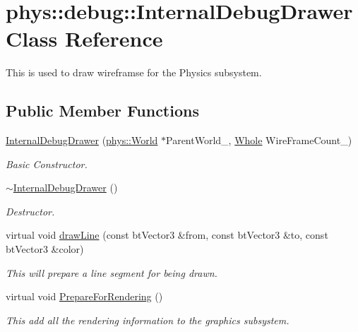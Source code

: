 \hypertarget{classphys_1_1debug_1_1InternalDebugDrawer}{
\section{phys::debug::InternalDebugDrawer Class Reference}
\label{db/d27/classphys_1_1debug_1_1InternalDebugDrawer}
}


This is used to draw wireframse for the Physics subsystem.  


\subsection*{Public Member Functions}
\begin{DoxyCompactItemize}
\item 
\hyperlink{classphys_1_1debug_1_1InternalDebugDrawer_a0e701e00e1080fdadfcf35e9051789a3}{InternalDebugDrawer} (\hyperlink{classphys_1_1World}{phys::World} $\ast$ParentWorld\_\-, \hyperlink{namespacephys_a460f6bc24c8dd347b05e0366ae34f34a}{Whole} WireFrameCount\_)
\begin{DoxyCompactList}\small\item\em Basic Constructor. \item\end{DoxyCompactList}\item 
\hyperlink{classphys_1_1debug_1_1InternalDebugDrawer_a9b5cb5ec48541effddb305de12508323}{$\sim$InternalDebugDrawer} ()
\begin{DoxyCompactList}\small\item\em Destructor. \item\end{DoxyCompactList}\item 
virtual void \hyperlink{classphys_1_1debug_1_1InternalDebugDrawer_a8a35c3c80fddaaec8e21f737ed1b3938}{drawLine} (const btVector3 \&from, const btVector3 \&to, const btVector3 \&color)
\begin{DoxyCompactList}\small\item\em This will prepare a line segment for being drawn. \item\end{DoxyCompactList}\item 
virtual void \hyperlink{classphys_1_1debug_1_1InternalDebugDrawer_a1002293d223ca20e5bccc3c3412ce262}{PrepareForRendering} ()
\begin{DoxyCompactList}\small\item\em This add all the rendering information to the graphics subsystem. \item\end{DoxyCompactList}\item 

\end{DoxyCompactItemize}
